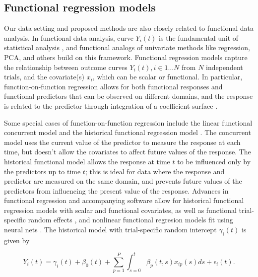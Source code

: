 \documentclass[preprint]{JASA}
\begin{document}
\hypertarget{functional-regression-models}{%
\subsection{Functional regression
models}\label{functional-regression-models}}

\label{sec:fda}

Our data setting and proposed methods are also closely related to
functional data analysis. In functional data analysis, curve \(Y_i(t)\)
is the fundamental unit of statistical analysis \citep{ramsay2005}, and
functional analogs of univariate methods like regression, PCA, and
others build on this framework. Functional regression models capture the
relationship between outcome curves \(Y_i(t), i \in 1 \ldots N\) from
\(N\) independent trials, and the covariate(s) \(x_i\), which can be
scalar or functional. In particular, function-on-function regression
allows for both functional responses and functional predictors that can
be observed on different domains, and the response is related to the
predictor through integration of a coefficient surface
\citep{ramsay2005}.

Some special cases of function-on-function regression include the linear
functional concurrent model \citep{fan2008, goldsmith2017} and the
historical functional regression model \citep{malfait2003, leroux2018}.
The concurrent model uses the current value of the predictor to measure
the response at each time, but doesn't allow the covariates to affect
future values of the response. The historical functional model allows
the response at time \(t\) to be influenced only by the predictors up to
time \(t\); this is ideal for data where the response and predictor are
measured on the same domain, and prevents future values of the
predictors from influencing the present value of the response. Advances
in functional regression and accompanying software allow for historical
functional regression models with scalar and functional covariates, as
well as functional trial-specific random effects
\citep{scheipl2015, scheipl2016, refund}, and nonlinear functional
regresion models fit using neural nets \citep{rao2021}. The historical
model with trial-specific random intercept \(\gamma_i(t)\) is given by

\begin{equation}
\label{eq:fhist_mod}    
Y_i(t) = \gamma_i(t) + \beta_0(t) +  \sum_{p = 1}^P \int_{s = 0}^t \beta_p(t,s) x_{ip}(s)ds+ \epsilon_i(t).
\end{equation}
\end{document}
